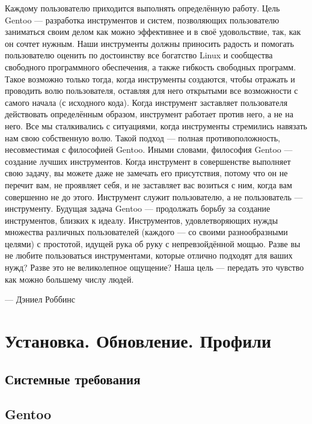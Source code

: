 \documentclass[12pt, a6paper]{article}
\begin{document}
Каждому пользователю приходится выполнять определённую работу. Цель Gentoo — разработка инструментов и систем, позволяющих пользователю заниматься своим делом как можно эффективнее и в своё удовольствие, так, как он сочтет нужным. Наши инструменты должны приносить радость и помогать пользователю оценить по достоинству все богатство Linux и сообщества свободного программного обеспечения, а также гибкость свободных программ. Такое возможно только тогда, когда инструменты создаются, чтобы отражать и проводить волю пользователя, оставляя для него открытыми все возможности с самого начала (с исходного кода). Когда инструмент заставляет пользователя действовать определённым образом, инструмент работает против него, а не на него. Все мы сталкивались с ситуациями, когда инструменты стремились навязать нам свою собственную волю. Такой подход — полная противоположность, несовместимая с философией Gentoo.
Иными словами, философия Gentoo — создание лучших инструментов. Когда инструмент в совершенстве выполняет свою задачу, вы можете даже не замечать его присутствия, потому что он не перечит вам, не проявляет себя, и не заставляет вас возиться с ним, когда вам совершенно не до этого. Инструмент служит пользователю, а не пользователь — инструменту.
Будущая задача Gentoo — продолжать борьбу за создание инструментов, близких к идеалу. Инструментов, удовлетворяющих нужды множества различных пользователей (каждого — со своими разнообразными целями) с простотой, идущей рука об руку с непревзойдённой мощью. Разве вы не любите пользоваться инструментами, которые отлично подходят для ваших нужд? Разве это не великолепное ощущение? Наша цель — передать это чувство как можно большему числу людей.
\newline
\begin{flushright}
— Дэниел Роббинс
\end{flushright}

\newpage

\section{Установка. Обновление. Профили}

\subsection{Системные требования}
\subsection{Gentoo}
\end{document}
